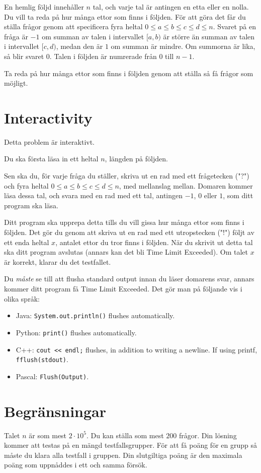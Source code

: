 En hemlig följd innehåller $n$ tal, och varje tal är antingen en etta eller en nolla. Du vill ta reda på hur många
ettor som finns i följden. För att göra det får du ställa frågor genom att specificera fyra heltal
$0 \leq a \leq b \leq c \leq d \leq n$. Svaret på en fråga är $-1$ om summan av talen i intervallet $[a,b)$ är större
än summan av talen i intervallet $[c,d)$, medan den är $1$ om summan är mindre. Om summorna är lika, så blir svaret $0$.
Talen i följden är numrerade från $0$ till $n-1$.

Ta reda på hur många ettor som finns i följden genom att ställa så få frågor som möjligt.

\section*{Interactivity}
Detta problem är interaktivt.

Du ska första läsa in ett heltal $n$, längden på följden.

Sen ska du, för varje fråga du ställer, skriva ut en rad med ett frågetecken ("?") och fyra heltal
$0 \leq a \leq b \leq c \leq d \leq n$, med mellanslag mellan. Domaren kommer läsa dessa tal,
och svara med en rad med ett tal, antingen $-1$, $0$ eller $1$, som ditt program ska läsa.

Ditt program ska upprepa detta tills du vill gissa hur många ettor som finns i följden. Det gör
du genom att skriva ut en rad med ett utropstecken ("!") följt av ett enda heltal $x$, antalet ettor
du tror finns i följden. När du skrivit ut detta tal ska ditt program avslutas (annars kan det bli
Time Limit Exceeded). Om talet $x$ är korrekt, klarar du det testfallet.

Du \emph{måste} se till att flusha standard output innan du läser domarens svar, annars kommer ditt program
få Time Limit Exceeded. Det gör man på följande vis i olika språk:
\begin{itemize}
  \item Java: \texttt{System.out.println()} flushes automatically.
  \item Python: \texttt{print()} flushes automatically.
  \item C++: \texttt{cout << endl;} flushes, in addition to writing a newline. If using printf, \texttt{fflush(stdout)}.
  \item Pascal: \texttt{Flush(Output)}.
\end{itemize}

\section*{Begränsningar}
Talet $n$ är som mest $2 \cdot 10^5$. Du kan ställa som mest $200$ frågor.
Din lösning kommer att testas på en mängd testfallsgrupper.
För att få poäng för en grupp så måste du klara alla testfall i gruppen.
Din slutgiltiga poäng är den maximala poäng som uppnåddes i ett och samma försök.

